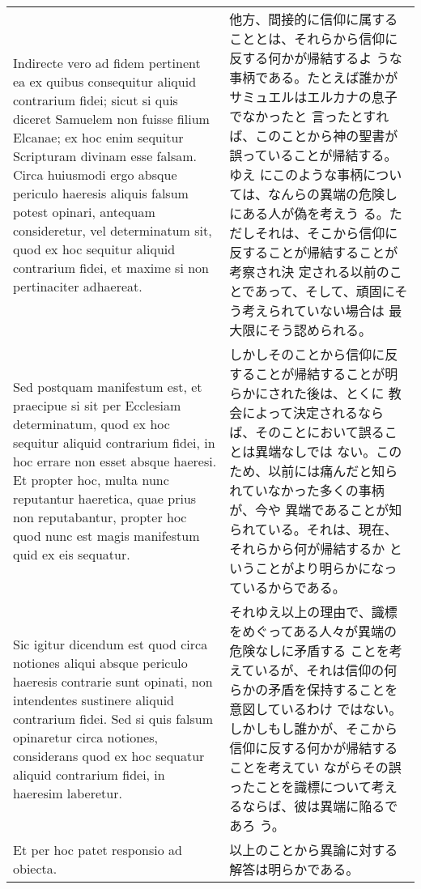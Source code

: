 \documentclass[10pt]{jsarticle} %
\begin{document}
\begin{longtable}{p{21em}p{21em}}
\\



Indirecte vero ad fidem pertinent ea
ex quibus consequitur aliquid contrarium fidei; sicut si quis diceret
Samuelem non fuisse filium Elcanae; ex hoc enim sequitur Scripturam
divinam esse falsam. Circa huiusmodi ergo absque periculo haeresis
aliquis falsum potest opinari, antequam consideretur, vel determinatum
sit, quod ex hoc sequitur aliquid contrarium fidei, et maxime si non
pertinaciter adhaereat. 



&

他方、間接的に信仰に属することとは、それらから信仰に反する何かが帰結するよ
 うな事柄である。たとえば誰かがサミュエルはエルカナの息子でなかったと
 言ったとすれば、このことから神の聖書が誤っていることが帰結する。ゆえ
 にこのような事柄については、なんらの異端の危険しにある人が偽を考えう
 る。ただしそれは、そこから信仰に反することが帰結することが考察され決
 定される以前のことであって、そして、頑固にそう考えられていない場合は
 最大限にそう認められる。

\\



Sed postquam manifestum est, et praecipue si
sit per Ecclesiam determinatum, quod ex hoc sequitur aliquid
contrarium fidei, in hoc errare non esset absque haeresi. Et propter
hoc, multa nunc reputantur haeretica, quae prius non reputabantur,
propter hoc quod nunc est magis manifestum quid ex eis sequatur. 



&

しかしそのことから信仰に反することが帰結することが明らかにされた後は、とくに
 教会によって決定されるならば、そのことにおいて誤ることは異端なしでは
 ない。このため、以前には痛んだと知られていなかった多くの事柄が、今や
 異端であることが知られている。それは、現在、それらから何が帰結するか
 ということがより明らかになっているからである。


\\


Sic
igitur dicendum est quod circa notiones aliqui absque periculo
haeresis contrarie sunt opinati, non intendentes sustinere aliquid
contrarium fidei. Sed si quis falsum opinaretur circa notiones,
considerans quod ex hoc sequatur aliquid contrarium fidei, in haeresim
laberetur.

&

それゆえ以上の理由で、識標をめぐってある人々が異端の危険なしに矛盾する
ことを考えているが、それは信仰の何らかの矛盾を保持することを意図しているわけ
 ではない。しかしもし誰かが、そこから信仰に反する何かが帰結することを考えてい
 ながらその誤ったことを識標について考えるならば、彼は異端に陥るであろ
 う。


\\



Et per hoc patet responsio ad obiecta.

&

以上のことから異論に対する解答は明らかである。

\end{longtable}
\end{document}
